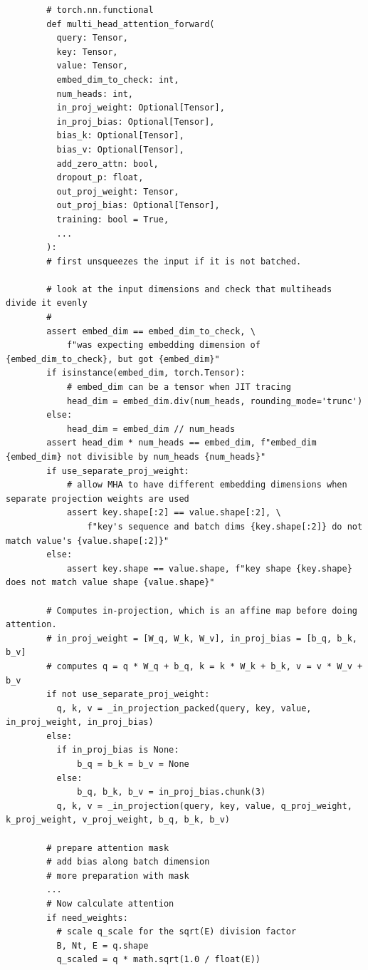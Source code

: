       \begin{lstlisting}
        # torch.nn.functional 
        def multi_head_attention_forward(
          query: Tensor,
          key: Tensor,
          value: Tensor,
          embed_dim_to_check: int,
          num_heads: int,
          in_proj_weight: Optional[Tensor],
          in_proj_bias: Optional[Tensor],
          bias_k: Optional[Tensor],
          bias_v: Optional[Tensor],
          add_zero_attn: bool,
          dropout_p: float,
          out_proj_weight: Tensor,
          out_proj_bias: Optional[Tensor],
          training: bool = True,
          ...
        ): 
        # first unsqueezes the input if it is not batched. 

        # look at the input dimensions and check that multiheads divide it evenly 
        #  
        assert embed_dim == embed_dim_to_check, \
            f"was expecting embedding dimension of {embed_dim_to_check}, but got {embed_dim}"
        if isinstance(embed_dim, torch.Tensor):
            # embed_dim can be a tensor when JIT tracing
            head_dim = embed_dim.div(num_heads, rounding_mode='trunc')
        else:
            head_dim = embed_dim // num_heads
        assert head_dim * num_heads == embed_dim, f"embed_dim {embed_dim} not divisible by num_heads {num_heads}"
        if use_separate_proj_weight:
            # allow MHA to have different embedding dimensions when separate projection weights are used
            assert key.shape[:2] == value.shape[:2], \
                f"key's sequence and batch dims {key.shape[:2]} do not match value's {value.shape[:2]}"
        else:
            assert key.shape == value.shape, f"key shape {key.shape} does not match value shape {value.shape}"

        # Computes in-projection, which is an affine map before doing attention. 
        # in_proj_weight = [W_q, W_k, W_v], in_proj_bias = [b_q, b_k, b_v] 
        # computes q = q * W_q + b_q, k = k * W_k + b_k, v = v * W_v + b_v
        if not use_separate_proj_weight:
          q, k, v = _in_projection_packed(query, key, value, in_proj_weight, in_proj_bias)
        else:
          if in_proj_bias is None:
              b_q = b_k = b_v = None
          else:
              b_q, b_k, b_v = in_proj_bias.chunk(3)
          q, k, v = _in_projection(query, key, value, q_proj_weight, k_proj_weight, v_proj_weight, b_q, b_k, b_v)

        # prepare attention mask 
        # add bias along batch dimension  
        # more preparation with mask
        ... 
        # Now calculate attention
        if need_weights:
          # scale q_scale for the sqrt(E) division factor 
          B, Nt, E = q.shape
          q_scaled = q * math.sqrt(1.0 / float(E))


\end{lstlisting}
